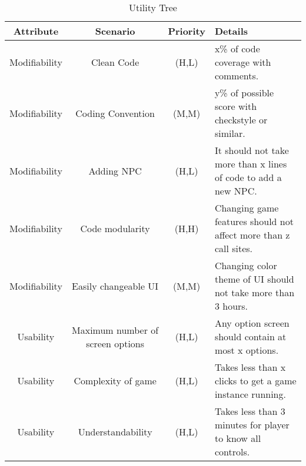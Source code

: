 \begin{table}[H]
	\begin{center}
		\begin{tabular}{| c | c | c | p{3cm}|}
    		\hline
		        \textbf{Attribute}		&	\textbf{Scenario} 	&   \textbf{Priority} 	& \textbf{Details} 			\\															
			\hline
			Modifiability			& 	Clean Code		& 	(H,L)			& x\% of code coverage with comments. 	\\
			Modifiability			&	Coding Convention	& 	(M,M)			& y\% of possible score with checkstyle or similar. \\
                        Modifiability & Adding NPC & (H,L) & It should not take more than x lines of code to add a new NPC. \\
                        Modifiability & Code modularity & (H,H) & Changing game features should not affect more than z call sites. \\
                        Modifiability & Easily changeable UI & (M,M) & Changing color theme of UI should not take more than 3 hours. \\
                        Usability & Maximum number of screen options & (H,L) & Any option screen should contain at most x options. \\
                        Usability & Complexity of game & (H,L) & Takes less than x clicks to get a game instance running. \\
                        Usability & Understandability & (H,L) & Takes less than 3 minutes for player to know all controls. \\
			\hline
    	\end{tabular}
	\end{center}
	\label{tab:Utility_tree}
	\caption{Utility Tree}
\end{table}
